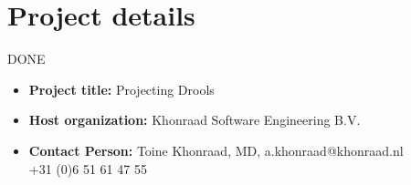 \section*{Project details}
{\LARGE DONE}

\begin{itemize}
    \item \textbf{Project title:} Projecting Drools
    \item \textbf{Host organization:} Khonraad Software Engineering B.V.
    \item \textbf{Contact Person:} Toine Khonraad, MD, a.khonraad@khonraad.nl\\ +31 (0)6 51 61 47 55
\end{itemize}